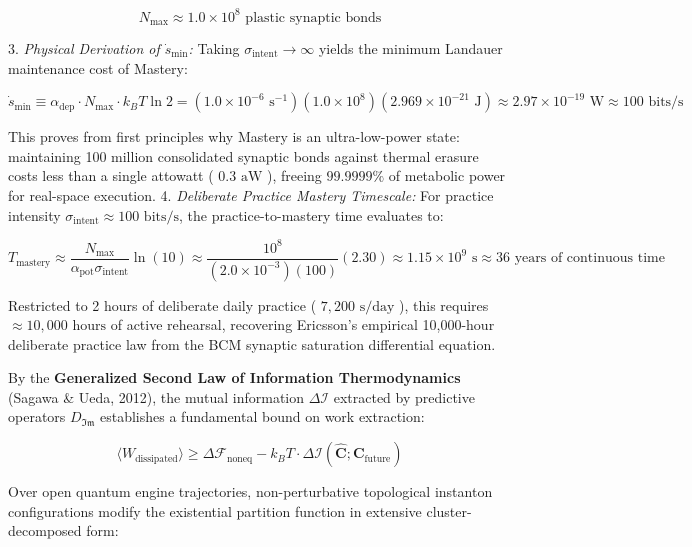 \documentclass[11pt,a4paper]{article}
\theoremstyle{definition}
\theoremstyle{remark}
\begin{document}
\begin{equation}
N_{\max} \approx 1.0 \times 10^8\text{ plastic synaptic bonds}
\end{equation}


3. \textit{Physical Derivation of $\dot{s}_{\min}$:} Taking $\sigma_{\text{intent}} \to \infty$ yields the minimum Landauer maintenance cost of Mastery:


\begin{equation}
\boxed{\dot{s}_{\min} \equiv \alpha_{\text{dep}} \cdot N_{\max} \cdot k_B T \ln 2 = (1.0 \times 10^{-6}\text{ s}^{-1})(1.0 \times 10^8)(2.969 \times 10^{-21}\text{ J}) \approx 2.97 \times 10^{-19}\text{ W} \approx 100\text{ bits/s}}
\end{equation}


This proves from first principles why Mastery is an ultra-low-power state: maintaining 100 million consolidated synaptic bonds against thermal erasure costs less than a single attowatt ( $0.3\text{ aW}$ ), freeing $99.9999\%$ of metabolic power for real-space execution.
4. \textit{Deliberate Practice Mastery Timescale:} For practice intensity $\sigma_{\text{intent}} \approx 100\text{ bits/s}$, the practice-to-mastery time evaluates to:


\begin{equation}
T_{\text{mastery}} \approx \frac{N_{\max}}{\alpha_{\text{pot}} \sigma_{\text{intent}}} \ln(10) \approx \frac{10^8}{(2.0 \times 10^{-3})(100)}(2.30) \approx 1.15 \times 10^9\text{ s} \approx 36\text{ years of continuous time}
\end{equation}


Restricted to 2 hours of deliberate daily practice ( $7{,}200\text{ s/day}$ ), this requires $\approx 10{,}000\text{ hours}$ of active rehearsal, recovering Ericsson's empirical 10,000-hour deliberate practice law from the BCM synaptic saturation differential equation.

By the \textbf{Generalized Second Law of Information Thermodynamics} (Sagawa \& Ueda, 2012), the mutual information $\Delta \mathcal{I}$ extracted by predictive operators $D_{\mathfrak{Im}}$ establishes a fundamental bound on work extraction:


\begin{equation}
\langle W_{\text{dissipated}} \rangle \ge \Delta \mathcal{F}_{\text{noneq}} - k_B T \cdot \Delta \mathcal{I}(\hat{\mathbf{C}}; \mathbf{C}_{\text{future}})
\end{equation}


Over open quantum engine trajectories, non-perturbative topological instanton configurations modify the existential partition function in extensive cluster-decomposed form:
\end{document}
